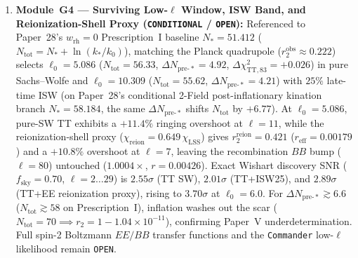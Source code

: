 \documentclass[11pt,a4paper]{article}
\begin{document}
\begin{enumerate}
\item \textbf{Module~G4 --- Surviving Low-$\ell$ Window, ISW Band, and Reionization-Shell Proxy (\texttt{CONDITIONAL} / \texttt{OPEN}):} Referenced to Paper~28's $w_{\mathrm{rh}}=0$ Prescription~I baseline $N_* = 51.412$ ($N_{\mathrm{tot}} = N_* + \ln(k_*/k_0)$), matching the Planck quadrupole ($r_2^{\mathrm{obs}}\approx 0.222$) selects $\ell_0 = 5.086$ ($N_{\mathrm{tot}} = 56.33$, $\Delta N_{\mathrm{pre}\text{-}*} = 4.92$, $\Delta\chi^2_{\mathrm{TT,83}}=+0.026$) in pure Sachs--Wolfe and $\ell_0 = 10.309$ ($N_{\mathrm{tot}}=55.62$, $\Delta N_{\mathrm{pre}\text{-}*}=4.21$) with $25\%$ late-time ISW (on Paper~28's conditional 2-Field post-inflationary kination branch $N_* = 58.184$, the same $\Delta N_{\mathrm{pre}\text{-}*}$ shifts $N_{\mathrm{tot}}$ by $+6.77$). At $\ell_0 = 5.086$, pure-SW TT exhibits a $+11.4\%$ ringing overshoot at $\ell=11$, while the reionization-shell proxy ($\chi_{\mathrm{reion}} = 0.649\,\chi_{\mathrm{LSS}}$) gives $r_2^{\mathrm{reion}} = 0.421$ ($r_{\mathrm{eff}} = 0.00179$) and a $+10.8\%$ overshoot at $\ell=7$, leaving the recombination $BB$ bump ($\ell=80$) untouched ($1.0004\times$, $r = 0.00426$). Exact Wishart discovery SNR ($f_{\mathrm{sky}} = 0.70$, $\ell=2\dots 29$) is $2.55\sigma$ (TT SW), $2.01\sigma$ (TT+ISW25), and $2.89\sigma$ (TT+EE reionization proxy), rising to $3.70\sigma$ at $\ell_0 = 6.0$. For $\Delta N_{\mathrm{pre}\text{-}*}\gtrsim 6.6$ ($N_{\mathrm{tot}}\gtrsim 58$ on Prescription~I), inflation washes out the scar ($N_{\mathrm{tot}}=70 \implies r_2 = 1 - 1.04\times 10^{-11}$), confirming Paper~V underdetermination. Full spin-2 Boltzmann $EE/BB$ transfer functions and the \texttt{Commander} low-$\ell$ likelihood remain \texttt{OPEN}.
\end{enumerate}
\end{document}
